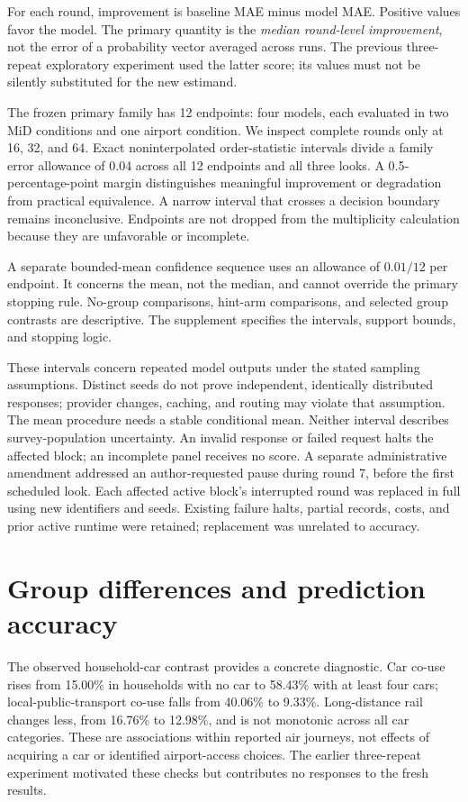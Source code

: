 \documentclass{article}
\begin{document}
For each round, improvement is baseline MAE minus model MAE. Positive values favor the model. The primary quantity is the \emph{median round-level improvement}, not the error of a probability vector averaged across runs. The previous three-repeat exploratory experiment used the latter score; its values must not be silently substituted for the new estimand.

The frozen primary family has 12 endpoints: four models, each evaluated in two MiD conditions and one airport condition. We inspect complete rounds only at 16, 32, and 64. Exact noninterpolated order-statistic intervals divide a family error allowance of 0.04 across all 12 endpoints and all three looks. A 0.5-percentage-point margin distinguishes meaningful improvement or degradation from practical equivalence. A narrow interval that crosses a decision boundary remains inconclusive. Endpoints are not dropped from the multiplicity calculation because they are unfavorable or incomplete.

A separate bounded-mean confidence sequence uses an allowance of $0.01/12$ per endpoint. It concerns the mean, not the median, and cannot override the primary stopping rule. No-group comparisons, hint-arm comparisons, and selected group contrasts are descriptive. The supplement specifies the intervals, support bounds, and stopping logic.

These intervals concern repeated model outputs under the stated sampling assumptions. Distinct seeds do not prove independent, identically distributed responses; provider changes, caching, and routing may violate that assumption. The mean procedure needs a stable conditional mean. Neither interval describes survey-population uncertainty. An invalid response or failed request halts the affected block; an incomplete panel receives no score. A separate administrative amendment addressed an author-requested pause during round 7, before the first scheduled look. Each affected active block's interrupted round was replaced in full using new identifiers and seeds. Existing failure halts, partial records, costs, and prior active runtime were retained; replacement was unrelated to accuracy.

\section{Group differences and prediction accuracy}
The observed household-car contrast provides a concrete diagnostic. Car co-use rises from 15.00\% in households with no car to 58.43\% with at least four cars; local-public-transport co-use falls from 40.06\% to 9.33\%. Long-distance rail changes less, from 16.76\% to 12.98\%, and is not monotonic across all car categories. These are associations within reported air journeys, not effects of acquiring a car or identified airport-access choices. The earlier three-repeat experiment motivated these checks but contributes no responses to the fresh results.
\end{document}
